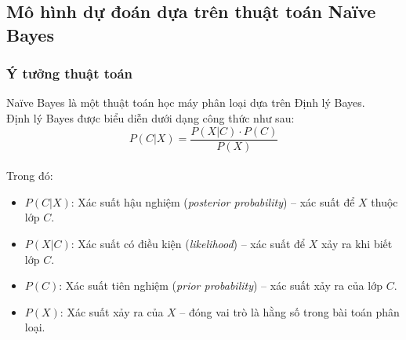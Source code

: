
 

\subsection{Mô hình dự đoán dựa trên thuật toán Naïve Bayes}
\subsubsection{Ý tưởng thuật toán }
Naïve Bayes là một thuật toán học máy phân loại dựa trên Định lý Bayes. \\

Định lý Bayes được biểu diễn dưới dạng công thức như sau: \\
\[P(C|X) = \frac{P(X|C) \cdot P(C)}{P(X)}\] \\

Trong đó:
\begin{itemize}
    \item \(P(C|X)\): Xác suất hậu nghiệm (\textit{posterior probability}) – xác suất để \(X\) thuộc lớp \(C\).
    \item \(P(X|C)\): Xác suất có điều kiện (\textit{likelihood}) – xác suất để \(X\) xảy ra khi biết lớp \(C\).
    \item \(P(C)\): Xác suất tiên nghiệm (\textit{prior probability}) – xác suất xảy ra của lớp \(C\).
    \item \(P(X)\): Xác suất xảy ra của \(X\) – đóng vai trò là hằng số trong bài toán phân loại.
\end{itemize}

